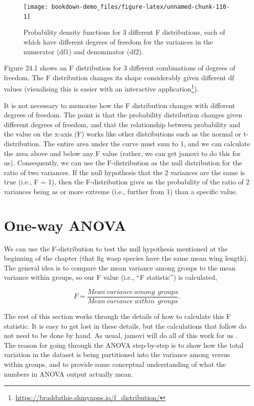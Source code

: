 \documentclass[
]{scrbook}
\begin{document}
\begin{figure}
\texttt{[image: bookdown-demo\_files/figure-latex/unnamed-chunk-110-1]} \caption{Probability density functions for 3 different F distributions, each of which have different degrees of freedom for the variances in the numerator (df1) and denominator (df2).}\label{fig:unnamed-chunk-110}
\end{figure}

Figure 24.1 shows an F distribution for 3 different combinations of degrees of freedom.
The F distribution changes its shape considerably given different df values (visualising this is easier with an interactive application\footnote{\url{https://bradduthie.shinyapps.io/f_distribution/}}).

It is not necessary to memorise how the F distribution changes with different degrees of freedom.
The point is that the probability distribution changes given different degrees of freedom, and that the relationship between probability and the value on the x-axis (F) works like other distributions such as the normal or t-distribution.
The entire area under the curve must sum to 1, and we can calculate the area above and below any F value (rather, we can get jamovi to do this for us).
Consequently, we can use the F-distribution as the null distribution for the ratio of two variances.
If the null hypothesis that the 2 variances are the same is true (i.e., F = 1), then the F-distribution gives us the probability of the ratio of 2 variances being as or more extreme (i.e., further from 1) than a specific value.

\hypertarget{one-way-anova}{%
\section{One-way ANOVA}\label{one-way-anova}}

We can use the F-distribution to test the null hypothesis mentioned at the beginning of the chapter (that fig wasp species have the same mean wing length).
The general idea is to compare the mean variance among groups to the mean variance within groups, so our F value (i.e., ``F statistic'') is calculated,

\[F = \frac{Mean\:variance\:among\:\:groups}{Mean\:variance\:within\:\:groups}.\]

The rest of this section works through the details of how to calculate this F statistic.
It is easy to get lost in these details, but the calculations that follow do not need to be done by hand.
As usual, jamovi will do all of this work for us \citep{Jamovi2022}.
The reason for going through the ANOVA step-by-step is to show how the total variation in the dataset is being partitioned into the variance among versus within groups, and to provide some conceptual understanding of what the numbers in ANOVA output actually mean.
\end{document}
